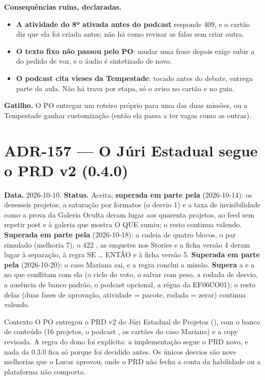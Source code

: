 \textbf{Consequências ruins, declaradas.}

\begin{itemize}
  \item \textbf{A atividade do 8º ativada antes do podcast} responde 409, e o
    cartão diz que ela foi criada antes; não há como revisar as falas sem criar
    outra.
  \item \textbf{O texto fixo não passou pelo PO}: mudar uma frase depois exige
    subir a  do pedido de voz, e o áudio é sintetizado de novo.
  \item \textbf{O podcast cita vieses da Tempestade}: tocado antes do debate,
    entrega parte da aula. Não há trava por etapa, só o aviso no cartão e no
    guia.
\end{itemize}

\textbf{Gatilho.} O PO entregar um roteiro próprio para uma das duas missões,
ou a Tempestade ganhar customização (então ela passa a ter vagas como as
outras).

\section{ADR-157 --- O Júri Estadual segue o PRD v2 (0.4.0)}
\label{adr:exp06ef1b-prd-v2}

\textbf{Data.} 2026-10-10. \textbf{Status.} Aceita; \textbf{superada em parte
pela } (2026-10-14): os dezesseis projetos, a saturação por
formatos (o desvio 1) e a taxa de invisibilidade como a prova da Galeria Oculta
deram lugar aos quarenta projetos, ao feed sem repetir post e à galeria que
mostra O QUE sumiu; o resto continua valendo. \textbf{Superada em parte
pela } (2026-10-18): a cadeia de quatro blocos, o par simulado
(melhoria 7), o 422 , as enquetes nos Stories e a ficha
versão 4 deram lugar à separação, à regra SE \ldots{} ENTÃO e à ficha versão 5.
\textbf{Superada em parte pela } (2026-10-20): o caso Mariana sai,
e a regra conclui a missão.
\textbf{Supera} a
 e a  no que conflitam com ela (o ciclo do voto, o
salvar com peso, a rodada de desvio, a ausência de banco padrão, o podcast
opcional, a régua da EF06CO01); o resto delas (duas fases de aprovação,
atividade = pacote, rodada = zerar) continua valendo.

\begin{especificacao}{Contexto}
O PO entregou o PRD v2 do Júri Estadual de Projetos (), com o
banco de conteúdo (16 projetos, o podcast , os cartões
do caso Mariana) e a copy revisada. A regra do dono foi explícita: a
implementação segue o PRD novo, e nada da 0.3.0 fica só porque foi decidido
antes. Os únicos desvios são nove melhorias que o Lucas aprovou, onde o PRD
não fecha a conta da habilidade ou a plataforma não comporta.
\end{especificacao}

